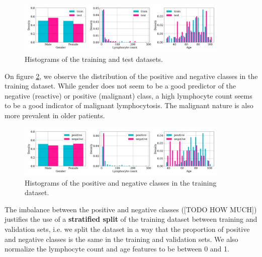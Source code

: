 \documentclass{midl}
\begin{document}
\begin{figure}[h!]
    \centering
    \includegraphics[width=0.9\textwidth]{figures/train_test_histograms.png}
    \caption{Histograms of the training and test datasets.}
    \label{fig:train_test_histograms}
\end{figure}

On figure \ref{fig:positive_negative_histograms}, we observe the distribution of the positive and negative classes in the training dataset. While gender does not seem to be a good predictor of the negative (reactive) or positive (malignant) class, a high lymphocyte count seems to be a good indicator of malignant lymphocytosis. The malignant nature is also more prevalent in older patients.

\begin{figure}[h!]
    \centering
    \includegraphics[width=0.9\textwidth]{figures/positive_negative_histograms.png}
    \caption{Histograms of the positive and negative classes in the training dataset.}
    \label{fig:positive_negative_histograms}
\end{figure}

The imbalance between the positive and negative classes ([TODO HOW MUCH]) justifies the use of a \textbf{stratified split} of the training dataset between training and validation sets, i.e. we split the dataset in a way that the proportion of positive and negative classes is the same in the training and validation sets. We also normalize the lymphocyte count and age features to be between 0 and 1.
\end{document}

